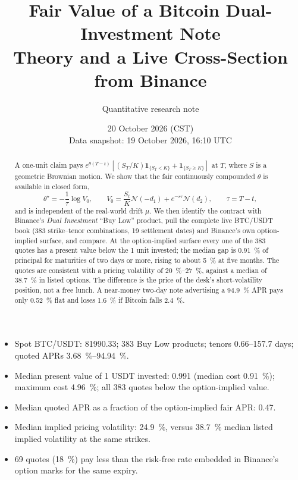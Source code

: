 \documentclass[11pt]{article}
\title{\bfseries Fair Value of a Bitcoin Dual-Investment Note\\[2pt]
\large Theory and a Live Cross-Section from Binance}
\author{Quantitative research note}
\date{20 October 2026 (CST) \\ \small Data snapshot: 19 October 2026, 16:10 UTC}
\newcommand{\N}{\mathcal{N}}
\newcommand{\ind}[1]{\mathbf{1}_{\{#1\}}}
\begin{document}
\maketitle

\begin{abstract}
\noindent
A one-unit claim pays $e^{\theta(T-t)}[(S_T/K)\ind{S_T<K}+\ind{S_T\ge K}]$ at $T$, where $S$ is a geometric Brownian motion. We show that the fair continuously compounded $\theta$ is available in closed form,
\[
\theta^\star=-\frac{1}{\tau}\log V_0,\qquad
V_0=\frac{S_t}{K}\N(-d_1)+e^{-r\tau}\N(d_2),\qquad \tau=T-t,
\]
and is independent of the real-world drift $\mu$. We then identify the contract with Binance's \emph{Dual Investment} ``Buy Low'' product, pull the complete live BTC/USDT book (383 strike--tenor combinations, 19 settlement dates) and Binance's own option-implied surface, and compare. At the option-implied surface every one of the 383 quotes has a present value below the 1 unit invested; the median gap is \SI{0.91}{\percent} of principal for maturities of two days or more, rising to about \SI{5}{\percent} at five months. The quotes are consistent with a pricing volatility of \SI{20}{\percent}--\SI{27}{\percent}, against a median of \SI{38.7}{\percent} in listed options. The difference is the price of the desk's short-volatility position, not a free lunch. A near-money two-day note advertising a \SI{94.9}{\percent} APR pays only \SI{0.52}{\percent} flat and loses \SI{1.6}{\percent} if Bitcoin falls \SI{2.4}{\percent}.
\end{abstract}

\begin{tcolorbox}[colback=inkblue!4,colframe=inkblue!55,title=\textbf{Key numbers at the snapshot}]
\begin{itemize}[leftmargin=1.2em,itemsep=2pt,topsep=2pt]
\item Spot BTC/USDT: \num{81990.33}; 383 Buy Low products; tenors \num{0.66}--\num{157.7} days; quoted APRs \SI{3.68}{\percent}--\SI{94.94}{\percent}.
\item Median present value of 1 USDT invested: \num{0.991} (median cost \SI{0.91}{\percent}); maximum cost \SI{4.96}{\percent}; all 383 quotes below the option-implied value.
\item Median quoted APR as a fraction of the option-implied fair APR: \num{0.47}.
\item Median implied pricing volatility: \SI{24.9}{\percent}, versus \SI{38.7}{\percent} median listed implied volatility at the same strikes.
\item 69 quotes (\SI{18}{\percent}) pay less than the risk-free rate embedded in Binance's option marks for the same expiry.
\end{itemize}
\end{tcolorbox}
\end{document}
